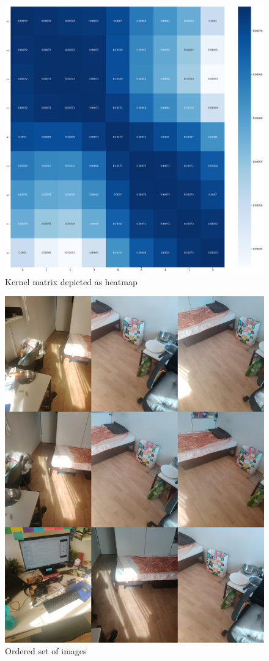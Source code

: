     \begin{figure}
    	\centering
    	\includegraphics[width=12cm]{images/ordered_K.png}
    	\caption{Kernel matrix depicted as heatmap}
    	\label{fig:ordered set of K}
    \end{figure}
	
    \begin{figure}
		\centering
		\includegraphics[width=12cm]{images/unordered_images.jpg}
		\caption{Ordered set of images}
		\label{fig:unordered set of images}
	\end{figure}
	

